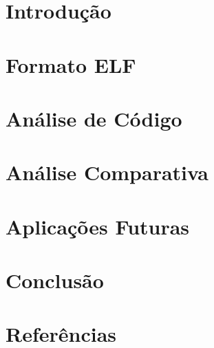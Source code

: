 \documentclass[a4paper,12pt]{report}
\begin{document}







\chapter{Introdução}\label{chap:intro}





\chapter{Formato ELF}\label{chap:elf}





\chapter{Análise de Código}\label{chap:code}






\chapter{Análise Comparativa}\label{chap:comp}


\chapter{Aplicações Futuras}\label{chap:future}



\chapter{Conclusão}\label{chap:concl}


\chapter{Referências}\label{chap:refs}


\appendix
% 
\end{document}
